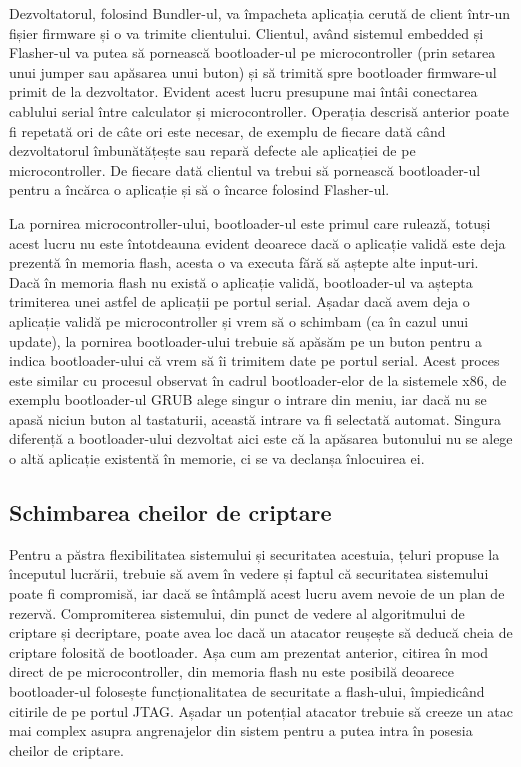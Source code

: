 \documentclass[12pt,a4paper,titlepage]{report}
\begin{document}
Dezvoltatorul, folosind Bundler-ul, va împacheta aplicația cerută de client într-un fișier firmware și o va trimite clientului. Clientul, având sistemul embedded și Flasher-ul va putea să pornească bootloader-ul pe microcontroller (prin setarea unui jumper sau apăsarea unui buton) și să trimită spre bootloader firmware-ul primit de la dezvoltator. Evident acest lucru presupune mai întâi conectarea cablului serial între calculator și microcontroller. Operația descrisă anterior poate fi repetată ori de câte ori este necesar, de exemplu de fiecare dată când dezvoltatorul îmbunătățește sau repară defecte ale aplicației de pe microcontroller. De fiecare dată clientul va trebui să pornească bootloader-ul pentru a încărca o aplicație și să o încarce folosind Flasher-ul.

La pornirea microcontroller-ului, bootloader-ul este primul care rulează, totuși acest lucru nu este întotdeauna evident deoarece dacă o aplicație validă este deja prezentă în memoria flash, acesta o va executa fără să aștepte alte input-uri. 
Dacă în memoria flash nu există o aplicație validă, bootloader-ul va aștepta trimiterea unei astfel de aplicații pe portul serial. Așadar dacă avem deja o aplicație validă pe microcontroller și vrem să o schimbam (ca în cazul unui update), la pornirea bootloader-ului trebuie să apăsăm pe un buton pentru a indica bootloader-ului că vrem să îi trimitem date pe portul serial. Acest proces este similar cu procesul observat în cadrul bootloader-elor de la sistemele x86, de exemplu bootloader-ul GRUB alege singur o intrare din meniu, iar dacă nu se apasă niciun buton al tastaturii, această intrare va fi selectată automat.
Singura diferență a bootloader-ului dezvoltat aici este că la apăsarea butonului nu se alege o altă aplicație existentă în memorie, ci se va declanșa înlocuirea ei.

\subsection{Schimbarea cheilor de criptare}
Pentru a păstra flexibilitatea sistemului și securitatea acestuia, țeluri propuse la începutul lucrării, trebuie să avem în vedere și faptul că securitatea sistemului poate fi compromisă, iar dacă se întâmplă acest lucru avem nevoie de un plan de rezervă. Compromiterea sistemului, din punct de vedere al algoritmului de criptare și decriptare, poate avea loc dacă un atacator reușește să deducă cheia de criptare folosită de bootloader. Așa cum am prezentat anterior, citirea în mod direct de pe microcontroller, din memoria flash nu este posibilă deoarece bootloader-ul folosește funcționalitatea de securitate a flash-ului, împiedicând citirile de pe portul JTAG. Așadar un potențial atacator trebuie să creeze un atac mai complex asupra angrenajelor din sistem pentru a putea intra în posesia cheilor de criptare.
\end{document}
